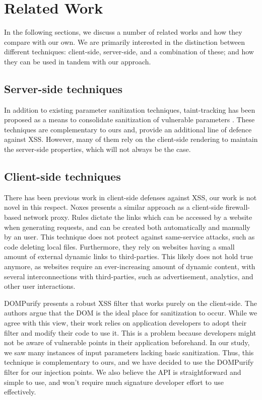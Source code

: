 \section{Related Work}
In the following sections, we discuss a number of related works and how they compare with our own. We are primarily interested in the distinction between different techniques: client-side, server-side, and a combination of these; and how they can be used in tandem with our approach.
\subsection{Server-side techniques} In addition to existing parameter sanitization techniques, taint-tracking has been proposed as a means to consolidate sanitization of vulnerable parameters \cite{Xu:2006:TPE:1267336.1267345,DBLP:conf/sec/Nguyen-TuongGGSE05,Pietraszek:2005:DAI:2146257.2146267,Bisht:2008:XPD:1428322.1428325}. These techniques are complementary to ours and, provide an additional line of defence against XSS. However, many of them rely on the client-side rendering to maintain the server-side properties, which will not always be the case.

\subsection{Client-side techniques} There has been previous work in client-side defenses against XSS, our work is not novel in this respect. Noxes \cite{Kirda:2009:CCS:2639535.2639808} presents a similar approach as a client-side firewall-based network proxy. Rules dictate the links which can be accessed by a website when generating requests, and can be created both automatically and manually by an user. This technique does not protect against same-service attacks, such as code deleting local files. Furthermore, they rely on websites having a small amount of external dynamic links to third-parties. This likely does not hold true anymore, as websites require an ever-increasing amount of dynamic content, with several interconnections with third-parties, such as advertisement, analytics, and other user interactions.

 DOMPurify  \cite{10.1007/978-3-319-66399-9_7} presents a robust XSS filter that works purely on the client-side. The authors argue that the DOM is the ideal place for sanitization to occur. While we agree with this view, their work relies on application developers to adopt their filter and modify their code to use it. This is a problem because developers might not be aware of vulnerable points in their application beforehand. In our study, we saw many instances of input parameters lacking basic sanitization. Thus, this technique is complementary to ours, and we have decided to use the DOMPurify filter for our injection points. We also believe the API is straightforward and simple to use, and won't require much signature developer effort to use effectively.
 
